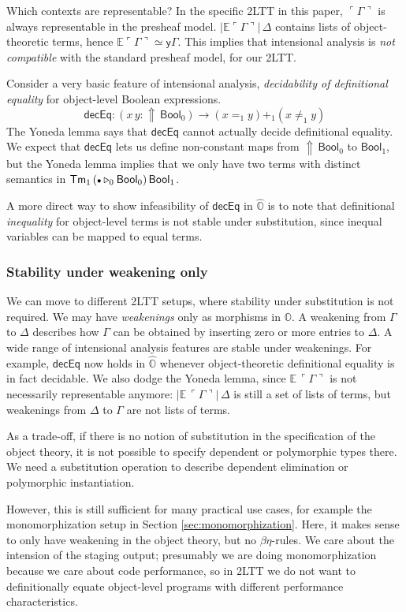 \documentclass[acmsmall,anonymous,review]{acmart}
\newcommand{\msf}[1]{\mathsf{#1}}
\newcommand{\mbb}[1]{\mathbb{#1}}
\newcommand{\ext}{\triangleright}
\newcommand{\Lift}{{\Uparrow}}
\newcommand{\mbbo}{\mbb{O}}
\newcommand{\Tm}{\msf{Tm}}
\newcommand{\Bool}{\msf{Bool}}
\newcommand{\emptycon}{\scaleobj{.75}\bullet}
\newcommand{\emb}[1]{\ulcorner#1\urcorner}
\newcommand{\hato}{\bm\hat{\mbbo}}
\newcommand{\ev}{\mbb{E}}
\theoremstyle{remark}
\newcommand{\yon}{\msf{y}}
\begin{document}
Which contexts are representable? In the specific 2LTT in this paper,
$\emb{\Gamma}$ is always representable in the presheaf
model. $|\ev{\emb{\Gamma}}|\,\Delta$ contains lists of object-theoretic terms,
hence $\ev{\emb{\Gamma}} \simeq \yon \Gamma$.  This implies that intensional
analysis is \emph{not compatible} with the standard presheaf model, for our
2LTT.

Consider a very basic feature of intensional analysis, \emph{decidability of
definitional equality} for object-level Boolean expressions.
\[
  \msf{decEq} : (x\,y : \Lift\,\Bool_0) \to (x =_1 y) +_1 (x \neq_1 y)
\]
The Yoneda lemma says that $\msf{decEq}$ cannot actually decide
definitional equality. We expect that $\msf{decEq}$ lets us define non-constant
maps from $\Lift\,\Bool_0$ to $\Bool_1$, but the Yoneda lemma implies that we
only have two terms with distinct semantics in $\Tm_1\,(\emptycon \ext_0
\Bool_0)\,\Bool_1$.

A more direct way to show infeasibility of $\msf{decEq}$ in $\hato$ is to note
that definitional \emph{inequality} for object-level terms is not stable under
substitution, since inequal variables can be mapped to equal terms.

\subsubsection{Stability under weakening only}
We can move to different 2LTT setups, where stability under substitution is not
required. We may have \emph{weakenings} only as morphisms in $\mbbo$.  A
weakening from $\Gamma$ to $\Delta$ describes how $\Gamma$ can be obtained by
inserting zero or more entries to $\Delta$. A wide range of intensional analysis
features are stable under weakenings. For example, $\msf{decEq}$ now holds in
$\hato$ whenever object-theoretic definitional equality is in fact decidable.
We also dodge the Yoneda lemma, since $\ev\,\emb{\Gamma}$ is not necessarily
representable anymore: $|\ev\,\emb{\Gamma}|\,\Delta$ is still a set of lists of
terms, but weakenings from $\Delta$ to $\Gamma$ are not lists of terms.

As a trade-off, if there is no notion of substitution in the specification of the
object theory, it is not possible to specify dependent or polymorphic types
there. We need a substitution operation to describe dependent elimination or
polymorphic instantiation.

However, this is still sufficient for many practical use cases, for example the
monomorphization setup in Section \ref{sec:monomorphization}. Here, it makes sense to only
have weakening in the object theory, but no $\beta\eta$-rules. We care about
the intension of the staging output; presumably we are doing monomorphization
because we care about code performance, so in 2LTT we do not want to
definitionally equate object-level programs with different performance
characteristics.
\end{document}

